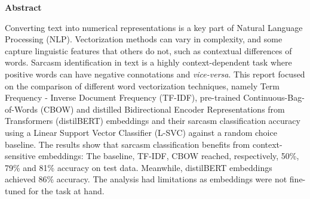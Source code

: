 \thispagestyle{empty}
\vspace*{\fill}
\begin{center}
    \textbf{Abstract}
\end{center}
Converting text into numerical representations is a key part of Natural Language Processing (NLP). Vectorization methods can vary in complexity, and some capture linguistic features that others do not, such as contextual differences of words. Sarcasm identification in text is a highly context-dependent task where positive words can have negative connotations and \textit{vice-versa}. This report focused on the comparison of different word vectorization techniques, namely Term Frequency - Inverse Document Frequency (TF-IDF), pre-trained Continuous-Bag-of-Words (CBOW) and distilled Bidirectional Encoder Representations from Transformers (distilBERT) embeddings and their sarcasm classification accuracy using a Linear Support Vector Classifier (L-SVC) against a random choice baseline. The results show that sarcasm classification benefits from context-sensitive embeddings: The baseline, TF-IDF, CBOW reached, respectively, 50\%, 79\% and 81\% accuracy on test data. Meanwhile, distilBERT embeddings achieved 86\% accuracy. The analysis had limitations as embeddings were not fine-tuned for the task at hand.
\vspace*{\fill}